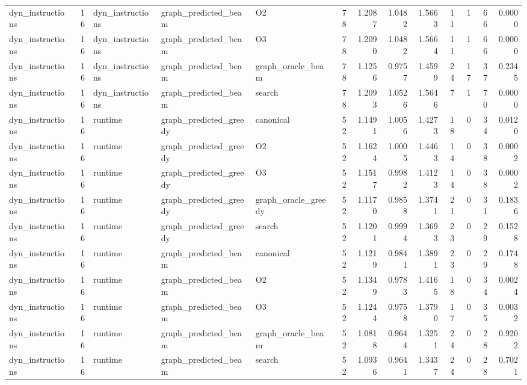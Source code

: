 \begin{table}[t]
\begin{tabular}{lrlllrrrrrrrr}
dyn\_instructions & 16 & dyn\_instructions & graph\_predicted\_beam & O2 & 78 & 1.2087 & 1.0482 & 1.5663 & 11 & 1 & 66 & 0.0000 \\
dyn\_instructions & 16 & dyn\_instructions & graph\_predicted\_beam & O3 & 78 & 1.2090 & 1.0482 & 1.5664 & 11 & 1 & 66 & 0.0000 \\
dyn\_instructions & 16 & dyn\_instructions & graph\_predicted\_beam & graph\_oracle\_beam & 78 & 1.1256 & 0.9757 & 1.4599 & 24 & 17 & 37 & 0.2345 \\
dyn\_instructions & 16 & dyn\_instructions & graph\_predicted\_beam & search & 78 & 1.2093 & 1.0526 & 1.5646 & 7 & 1 & 70 & 0.0000 \\
dyn\_instructions & 16 & runtime & graph\_predicted\_greedy & canonical & 52 & 1.1491 & 1.0056 & 1.4273 & 18 & 0 & 34 & 0.0120 \\
dyn\_instructions & 16 & runtime & graph\_predicted\_greedy & O2 & 52 & 1.1624 & 1.0005 & 1.4463 & 14 & 0 & 38 & 0.0002 \\
dyn\_instructions & 16 & runtime & graph\_predicted\_greedy & O3 & 52 & 1.1517 & 0.9982 & 1.4123 & 14 & 0 & 38 & 0.0002 \\
dyn\_instructions & 16 & runtime & graph\_predicted\_greedy & graph\_oracle\_greedy & 52 & 1.1170 & 0.9858 & 1.3741 & 21 & 0 & 31 & 0.1836 \\
dyn\_instructions & 16 & runtime & graph\_predicted\_greedy & search & 52 & 1.1201 & 0.9994 & 1.3693 & 23 & 0 & 29 & 0.1528 \\
dyn\_instructions & 16 & runtime & graph\_predicted\_beam & canonical & 52 & 1.1219 & 0.9841 & 1.3891 & 23 & 0 & 29 & 0.1748 \\
dyn\_instructions & 16 & runtime & graph\_predicted\_beam & O2 & 52 & 1.1349 & 0.9783 & 1.4165 & 18 & 0 & 34 & 0.0024 \\
dyn\_instructions & 16 & runtime & graph\_predicted\_beam & O3 & 52 & 1.1244 & 0.9758 & 1.3790 & 17 & 0 & 35 & 0.0032 \\
dyn\_instructions & 16 & runtime & graph\_predicted\_beam & graph\_oracle\_beam & 52 & 1.0818 & 0.9644 & 1.3251 & 24 & 0 & 28 & 0.9202 \\
dyn\_instructions & 16 & runtime & graph\_predicted\_beam & search & 52 & 1.0936 & 0.9641 & 1.3437 & 24 & 0 & 28 & 0.7021 \\
\bottomrule
\end{tabular}
\end{table}
